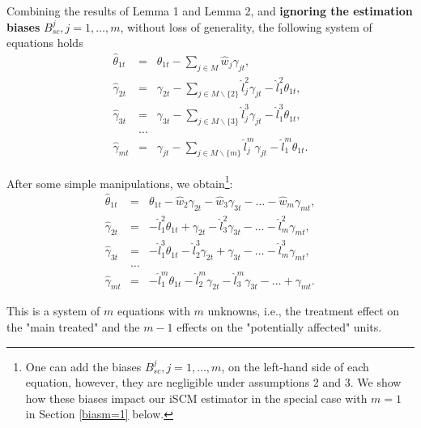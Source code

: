 Combining the results of Lemma 1 and Lemma 2, and \textbf{ignoring the estimation biases} $B^j_{sc}, j=1,\ldots,m$,  without loss of generality, the following system of equations holds
\begin{eqnarray*}
\widehat{\theta}_{1t}&=&\theta_{1t} - \sum_{j \in M} \widehat{w}_{j}{\gamma_{jt}},\\
\widehat{\gamma}_{2t}&=&\gamma_{2t} - \sum_{j \in M \backslash \{{2} \}}{\widehat{l}_{j}^{2}}{\gamma_{jt}} - \widehat{l}_{1}^{2}{\theta_{1t}},\\
\widehat{\gamma}_{3t}&=&\gamma_{3t} - \sum_{j \in M \backslash \{{3} \}}{\widehat{l}_{j}^{3}}{\gamma_{jt}}- \widehat{l}_{1}^{3}{\theta_{1t}},\\
&\ldots&\\
\widehat{\gamma}_{mt}&=&\gamma_{jt} - \sum_{j \in M \backslash \{{m} \}}{\widehat{l}_{j}^{m}}{\gamma_{jt}}- \widehat{l}_{1}^{m}{\theta_{1t}}.
\end{eqnarray*}

After some simple manipulations, we obtain\footnote{One can add the biases $B^j_{sc}, j=1,\ldots,m$, on the left-hand side of each equation, however, they are negligible under assumptions 2 and 3. We show how these biases impact our iSCM estimator in the special case with $m=1$ in Section \ref{biasm=1} below. }:
\begin{eqnarray*}
\widehat{\theta}_{1t}&=&\theta_{1t} - \widehat{w}_{2}{\gamma_{2t}}- \widehat{w}_{3}{\gamma_{3t}}- \ldots - \widehat{w}_{m}{\gamma_{mt}},\\
\widehat{\gamma}_{2t}&=&- \widehat{l}_{1}^{2}{\theta_{1t}} + \gamma_{2t} - \widehat{l}_{3}^{2}{\gamma_{3t}} - \ldots - \widehat{l}_{m}^{2}{\gamma_{mt}},\\
\widehat{\gamma}_{3t}&=&- \widehat{l}_{1}^{3}{\theta_{1t}} - \widehat{l}_{2}^{3}{\gamma_{2t}}+ \gamma_{3t} - \ldots - \widehat{l}_{m}^{3}{\gamma_{mt}},\\
&\ldots&\\
\widehat{\gamma}_{mt}&=&- \widehat{l}_{1}^{m}{\theta_{1t}} - \widehat{l}_{2}^{m}{\gamma_{2t}} - \widehat{l}_{3}^{m}{\gamma_{3t}} - \ldots +{\gamma_{mt}}.
\end{eqnarray*}

This is a system of $m$ equations with $m$ unknowns, i.e., the  treatment effect on the "main treated" and the $m-1$ effects on the "potentially affected" units. 

